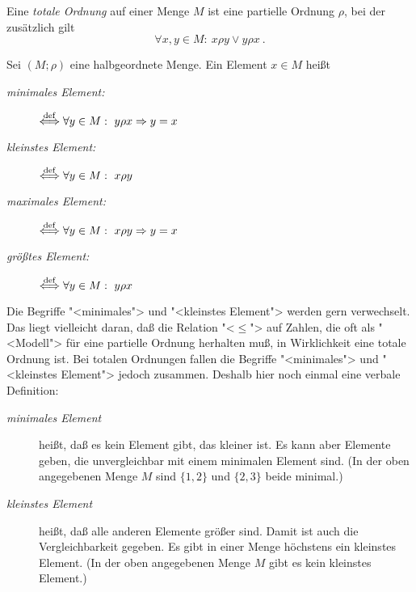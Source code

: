 \begin{definition}
  \label{def:total-order}
    Eine \emph{totale Ordnung} 
    auf einer Menge $M$ ist eine partielle Ordnung
    $\rho$, bei der zusätzlich gilt
    \[ \forall x,y \in M:\ x \rho y \vee y \rho x\ .\]
\end{definition}
\begin{definition}
    Sei $(M;\rho)$ eine halbgeordnete Menge. Ein Element $x \in M$ heißt
    \begin{description}
    \item[\it minimales Element:] $\stackrel{\rm def}{\Longleftrightarrow} \forall y \in M:\  y \rho x 
                                         \Rightarrow y=x$
    \item[\it kleinstes Element:] $\stackrel{\rm def}{\Longleftrightarrow} \forall y \in M:\  x \rho y$
    \item[\it maximales Element:] $\stackrel{\rm def}{\Longleftrightarrow} \forall y \in M:\  x \rho y 
                                         \Rightarrow y=x$
    \item[\it größtes Element:] $\stackrel{\rm def}{\Longleftrightarrow} \forall y \in M:\  y \rho x$
    \end{description}
\end{definition}

Die Begriffe "<minimales"> und 
"<kleinstes Element"> werden gern
verwechselt. Das liegt vielleicht daran, daß die Relation "<$\leq$"> auf
Zahlen, die oft als "<Modell"> für eine partielle Ordnung herhalten muß, in
Wirklichkeit eine totale Ordnung ist. Bei totalen Ordnungen fallen die Begriffe
"<minimales"> und "<kleinstes Element"> jedoch zusammen.
Deshalb hier noch einmal eine verbale Definition:
\begin{description}
\item[\it minimales Element] heißt, daß es kein Element gibt, das kleiner
             ist. Es kann aber Elemente geben, die unvergleichbar mit einem
             minimalen Element sind. (In der oben angegebenen Menge $M$ sind
             $\{1,2\}$ und $\{2,3\}$ beide minimal.)
\item[\it kleinstes Element] heißt, daß alle anderen Elemente größer
             sind. Damit ist auch die Vergleichbarkeit gegeben. Es gibt in einer
             Menge höchstens ein kleinstes Element. (In der oben
             angegebenen Menge $M$ gibt es kein kleinstes Element.)
\end{description}

